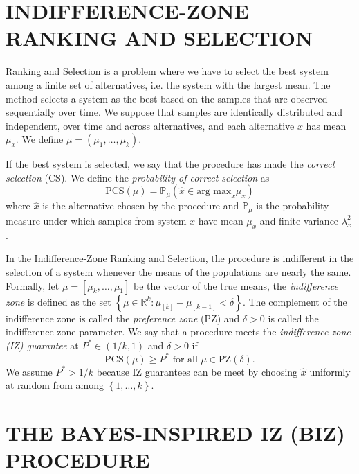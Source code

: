 \documentclass{wscpaperproc}
\theoremstyle{wsc}
\providecommand{\DIFaddtex}[1]{{\protect\color{blue}\uwave{#1}}} %
\providecommand{\DIFdeltex}[1]{{\protect\color{red}\sout{#1}}}                      %
\providecommand{\DIFaddbegin}{} %
\providecommand{\DIFaddend}{} %
\providecommand{\DIFdelbegin}{} %
\providecommand{\DIFdelend}{} %
\providecommand{\DIFadd}[1]{\texorpdfstring{\DIFaddtex{#1}}{#1}} %
\providecommand{\DIFdel}[1]{\texorpdfstring{\DIFdeltex{#1}}{}} %
\begin{document}
\section{INDIFFERENCE-ZONE RANKING AND SELECTION}
\DIFaddbegin \label{IZR}
\DIFaddend 

Ranking and Selection is a problem where we have to select the best system
among a finite set of alternatives, i.e. the system with the largest
mean. The method selects a system as the best based on the samples
that are observed sequentially over time. We suppose that samples
are identically distributed and independent, over time and across alternatives, and
each alternative $x$ has mean $\mu_{x}$. We define $\mu=(\mu_{1},\ldots,\mu_{k})$.

If the best system is selected, we say that the procedure has made the \emph{correct selection}
(CS). We define the \emph{probability of correct selection} as 
\[
\mbox{PCS}\left(\mu\right)=\mathbb{P}_{\mu}\left(\hat{x}\in\mbox{arg max}_{x}\mu_{x}\right)
\]
where $\hat{x}$ is the alternative chosen by the procedure and $\mathbb{P}_{\mu}$
is the probability measure under which samples from system $x$ have
mean $\mu_{x}$ and finite variance $\lambda_{x}^{2}$.

In the Indifference-Zone Ranking and Selection, the procedure is indifferent
in the selection of a system whenever the means of the populations
are nearly the same. Formally, let \DIFdelbegin \DIFdel{$\mu=\left[\mu_{k},\ldots,\mu_{1}\right]$
}\DIFdelend \DIFaddbegin \DIFadd{$\mu=\left[\mu_{1},\ldots,\mu_{k}\right]$
}\DIFaddend be the vector of the true means, the \emph{indifference zone} is defined
as the set $\left\{ \mu\in\mathbb{R}^{k}:\mu_{\left[k\right]}-\mu_{\left[k-1\right]}<\delta\right\} $.
The complement of the indifference zone is called the \emph{preference
zone} (PZ) and $\delta>0$ is called the indifference zone parameter.
We say that a procedure meets the \emph{indifference-zone (IZ) guarantee
}at $P^{*}\in\left(1/k,1\right)$ and $\delta>0$ if
\[
\mbox{PCS}\left(\mu\right)\geq P^{*}\mbox{ for all }\mu\in\mbox{PZ}\left(\delta\right).
\]
We assume $P^{*}>1/k$ because IZ guarantees can be meet by choosing
$\hat{x}$ uniformly at random from \DIFdelbegin \DIFdel{among }\DIFdelend $\left\{ 1,\ldots,k\right\} $.


\section{THE BAYES-INSPIRED IZ (BIZ) PROCEDURE}
\label{sec:BIZ}
\end{document}
